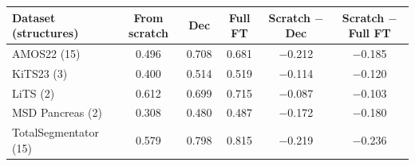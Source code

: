 \begin{tabular}{@{}lccccc@{}}
\toprule
Dataset (structures) & From scratch & Dec & Full FT & Scratch $-$ Dec & Scratch $-$ Full FT \\
\midrule
AMOS22 (15) & 0.496 & 0.708 & 0.681 & $-$0.212 & $-$0.185 \\
KiTS23 (3) & 0.400 & 0.514 & 0.519 & $-$0.114 & $-$0.120 \\
LiTS (2) & 0.612 & 0.699 & 0.715 & $-$0.087 & $-$0.103 \\
MSD Pancreas (2) & 0.308 & 0.480 & 0.487 & $-$0.172 & $-$0.180 \\
TotalSegmentator (15) & 0.579 & 0.798 & 0.815 & $-$0.219 & $-$0.236 \\
\bottomrule
\end{tabular}
